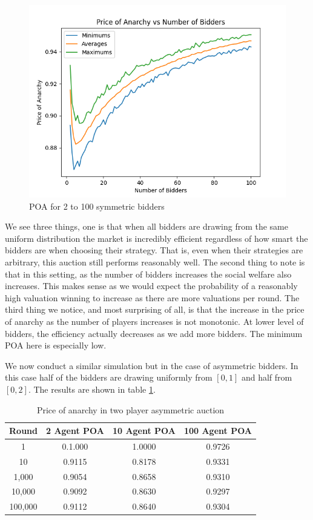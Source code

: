 \documentclass[12pt,twoside]{reedthesis}
\begin{document}
\begin{figure}[h!]
	\centering
	\includegraphics[scale=.8]{Figures/zi_symmetric}
	\caption{POA for 2 to 100 symmetric bidders}
	\label{zi_symmetric}
\end{figure}
 

 We see three things, one is that when all bidders are drawing from the same uniform distribution the market is incredibly efficient regardless of how smart the bidders are when choosing their strategy. That is, even when their strategies are arbitrary, this auction still performs reasonably well. The second thing to note is that in this setting, as the number of bidders increases the social welfare also increases. This makes sense as we would expect the probability of a reasonably high valuation winning to increase as there are  more valuations per round. The third thing we notice, and most surprising of all, is that the increase in the price of anarchy as the number of players increases is not monotonic. At lower level of bidders, the efficiency actually decreases as we add more bidders. The minimum POA here is especially low.

We now conduct a similar simulation but in the case of asymmetric bidders. In this case half of the bidders are drawing uniformly from $[0,1]$ and half from $[0,2]$. The results are shown in table \ref{table:zero_int_asymmetric}. 

\begin{table}[h!]
	\begin{center}
		\begin{tabular}{ |c|c|c|c| }
			\hline
			Round & 2 Agent POA & 10 Agent POA & 100 Agent POA \\
			\hline
			1 & 0.1.000 & 1.0000 & 0.9726\\
			10 & 0.9115 & 0.8178 & 0.9331\\
			1,000 & 0.9054 & 0.8658 & 0.9310\\
			10,000 & 0.9092 & 0.8630 & 0.9297\\
			100,000 & 0.9112 & 0.8640 & 0.9304\\
			\hline
		\end{tabular}
		\caption{Price of anarchy in two player asymmetric auction}
		\label{table:zero_int_asymmetric}
	\end{center} 
\end{table}
\end{document}
